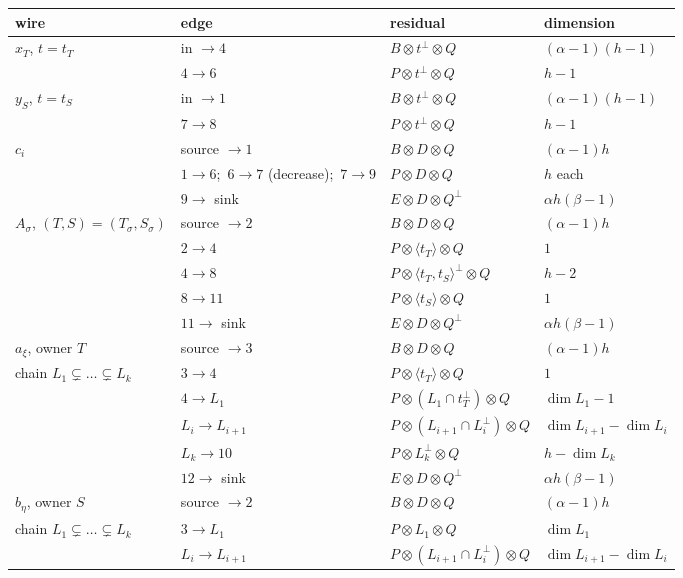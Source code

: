 \begin{table}[ht]\centering\small
\begin{tabular}{@{}l l l l@{}}
\toprule
wire & edge & residual & dimension\\
\midrule
$x_T$, $t=t_T$ & in $\to4$ & $B\otimes t^\perp\otimes Q$ & $(\alpha-1)(h-1)$\\
 & $4\to6$ & $P\otimes t^\perp\otimes Q$ & $h-1$\\
$y_S$, $t=t_S$ & in $\to1$ & $B\otimes t^\perp\otimes Q$ & $(\alpha-1)(h-1)$\\
 & $7\to8$ & $P\otimes t^\perp\otimes Q$ & $h-1$\\
$c_i$ & source $\to1$ & $B\otimes D\otimes Q$ & $(\alpha-1)h$\\
 & $1\to6$;\ $6\to7$ (decrease);\ $7\to9$ & $P\otimes D\otimes Q$ & $h$ each\\
 & $9\to$ sink & $E\otimes D\otimes Q^\perp$ & $\alpha h(\beta-1)$\\
$A_\sigma$, $(T,S)=(T_\sigma,S_\sigma)$ & source $\to2$ & $B\otimes D\otimes Q$ & $(\alpha-1)h$\\
 & $2\to4$ & $P\otimes\langle t_T\rangle\otimes Q$ & $1$\\
 & $4\to8$ & $P\otimes\langle t_T,t_S\rangle^\perp\otimes Q$ & $h-2$\\
 & $8\to11$ & $P\otimes\langle t_S\rangle\otimes Q$ & $1$\\
 & $11\to$ sink & $E\otimes D\otimes Q^\perp$ & $\alpha h(\beta-1)$\\
$a_\xi$, owner $T$ & source $\to3$ & $B\otimes D\otimes Q$ & $(\alpha-1)h$\\
\quad chain $L_1\subsetneq\dots\subsetneq L_k$ & $3\to4$ & $P\otimes\langle t_T\rangle\otimes Q$ & $1$\\
 & $4\to L_1$ & $P\otimes(L_1\cap t_T^\perp)\otimes Q$ & $\dim L_1-1$\\
 & $L_i\to L_{i+1}$ & $P\otimes(L_{i+1}\cap L_i^\perp)\otimes Q$ & $\dim L_{i+1}-\dim L_i$\\
 & $L_k\to10$ & $P\otimes L_k^\perp\otimes Q$ & $h-\dim L_k$\\
 & $12\to$ sink & $E\otimes D\otimes Q^\perp$ & $\alpha h(\beta-1)$\\
$b_\eta$, owner $S$ & source $\to2$ & $B\otimes D\otimes Q$ & $(\alpha-1)h$\\
\quad chain $L_1\subsetneq\dots\subsetneq L_k$ & $3\to L_1$ & $P\otimes L_1\otimes Q$ & $\dim L_1$\\
 & $L_i\to L_{i+1}$ & $P\otimes(L_{i+1}\cap L_i^\perp)\otimes Q$ & $\dim L_{i+1}-\dim L_i$\\

\end{tabular}
\end{table}
